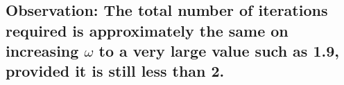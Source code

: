\documentclass[11pt]{article}
\begin{document}
    \begin{center}
    \end{center}
    { \hspace*{\fill} \\}
    
    \begin{center}
    \end{center}
    { \hspace*{\fill} \\}
    
    \begin{center}
    \end{center}
    { \hspace*{\fill} \\}
    
    \hypertarget{observation-the-total-number-of-iterations-required-is-approximately-the-same-on-increasing-omega-to-a-very-large-value-such-as-1.9-provided-it-is-still-less-than-2.}{%
\subsection{\texorpdfstring{Observation: The total number of iterations
required is approximately the same on increasing \(\omega\) to a very
large value such as 1.9, provided it is still less than
2.}{Observation: The total number of iterations required is approximately the same on increasing \textbackslash{}omega to a very large value such as 1.9, provided it is still less than 2.}}\label{observation-the-total-number-of-iterations-required-is-approximately-the-same-on-increasing-omega-to-a-very-large-value-such-as-1.9-provided-it-is-still-less-than-2.}}
\end{document}
